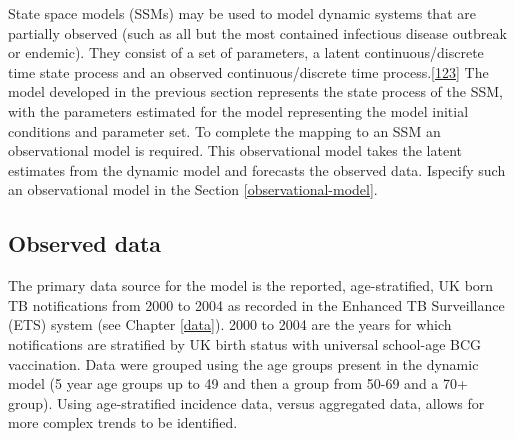 \documentclass[11pt,twoside]{bristolthesis}
\begin{document}
  State space models (SSMs) may be used to model dynamic systems that are partially observed (such as all but the most contained infectious disease outbreak or endemic). They consist of a set of parameters, a latent continuous/discrete time state process and an observed continuous/discrete time process.{[}\protect\hyperlink{ref-Murray2015}{123}{]} The model developed in the previous section represents the state process of the SSM, with the parameters estimated for the model representing the model initial conditions and parameter set. To complete the mapping to an SSM an observational model is required. This observational model takes the latent estimates from the dynamic model and forecasts the observed data. Ispecify such an observational model in the Section \ref{observational-model}.
  
  \hypertarget{observed-data}{%
  \subsection{Observed data}\label{observed-data}}
  
  The primary data source for the model is the reported, age-stratified, UK born TB notifications from 2000 to 2004 as recorded in the Enhanced TB Surveillance (ETS) system (see Chapter \ref{data}). 2000 to 2004 are the years for which notifications are stratified by UK birth status with universal school-age BCG vaccination. Data were grouped using the age groups present in the dynamic model (5 year age groups up to 49 and then a group from 50-69 and a 70+ group). Using age-stratified incidence data, versus aggregated data, allows for more complex trends to be identified.
  
\end{document}
